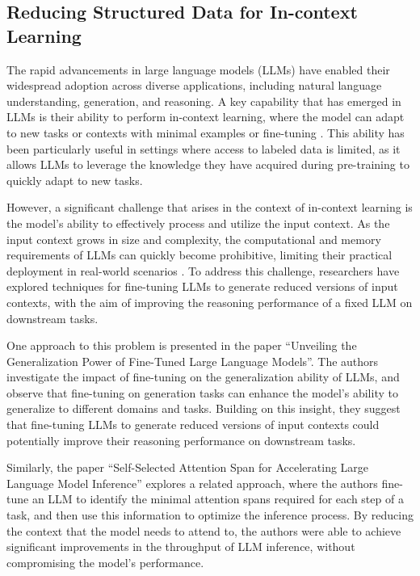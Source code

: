 \documentclass[11pt]{article}
\begin{document}
\subsection{Reducing Structured Data for In-context Learning}

The rapid advancements in large language models (LLMs) have enabled their widespread adoption across diverse applications, including natural language understanding, generation, and reasoning. A key capability that has emerged in LLMs is their ability to perform in-context learning, where the model can adapt to new tasks or contexts with minimal examples or fine-tuning \cite{ref227,ref228}. This ability has been particularly useful in settings where access to labeled data is limited, as it allows LLMs to leverage the knowledge they have acquired during pre-training to quickly adapt to new tasks.

However, a significant challenge that arises in the context of in-context learning is the model's ability to effectively process and utilize the input context. As the input context grows in size and complexity, the computational and memory requirements of LLMs can quickly become prohibitive, limiting their practical deployment in real-world scenarios \cite{ref229}. To address this challenge, researchers have explored techniques for fine-tuning LLMs to generate reduced versions of input contexts, with the aim of improving the reasoning performance of a fixed LLM on downstream tasks.

One approach to this problem is presented in the paper ``Unveiling the Generalization Power of Fine-Tuned Large Language Models''. The authors investigate the impact of fine-tuning on the generalization ability of LLMs, and observe that fine-tuning on generation tasks can enhance the model's ability to generalize to different domains and tasks. Building on this insight, they suggest that fine-tuning LLMs to generate reduced versions of input contexts could potentially improve their reasoning performance on downstream tasks.

Similarly, the paper ``Self-Selected Attention Span for Accelerating Large Language Model Inference'' explores a related approach, where the authors fine-tune an LLM to identify the minimal attention spans required for each step of a task, and then use this information to optimize the inference process. By reducing the context that the model needs to attend to, the authors were able to achieve significant improvements in the throughput of LLM inference, without compromising the model's performance.
\end{document}
